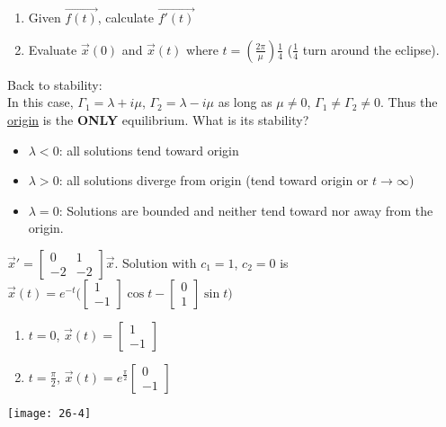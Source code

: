\begin{enumerate}[label=\protect\circled{\arabic*}]
	\item Given $\vec{f(t)}$, calculate $\vec{f'(t)}$
	\item Evaluate $\vec{x}(0)$ and $\vec{x}(t)$ where $t = (\frac{2\pi}{\mu})\frac{1}{4}$ ($\frac{1}{4}$ turn around the eclipse).
\end{enumerate}
Back to stability:\\
In this case, $\Gamma_1 = \lambda + i\mu$, $\Gamma_2 = \lambda - i\mu$ as long as $\mu \neq 0$, $\Gamma_1 \neq \Gamma_2 \neq 0$. Thus the \underline{origin} is the \textbf{ONLY} equilibrium. What is its stability?
\begin{itemize}
	\item $\lambda < 0$: all solutions tend toward origin
	\item $\lambda > 0$: all solutions diverge from origin (tend toward origin or $t \rightarrow \infty$)
	\item $\lambda = 0$: Solutions are bounded and neither tend toward nor away from the origin.
\end{itemize}
\begin{example-N}
	$\vec{x}' = \begin{bmatrix}
		0 & 1\\ -2 & -2
	\end{bmatrix} \vec{x}$. Solution with $c_1 = 1$, $c_2 = 0$ is $\vec{x}(t) = e^{-t} \bigg(\begin{bmatrix}
		1\\-1
	\end{bmatrix} \cos t - \begin{bmatrix}
		0\\1
	\end{bmatrix} \sin t \bigg)$
	\begin{multicols}{2}
		\begin{enumerate}[label=\protect\circled{\alph*}]
		\item $t = 0$, $\vec{x}(t) = \begin{bmatrix}
			1\\-1
		\end{bmatrix}$
		\item $t = \frac{\pi}{2}$, $\vec{x}(t) = e^{\frac{\pi}{2}} \begin{bmatrix}
			0\\-1
		\end{bmatrix}$
	\end{enumerate}
	\end{multicols}
	\begin{center}
		\texttt{[image: 26-4]}
	\end{center}
\end{example-N}
